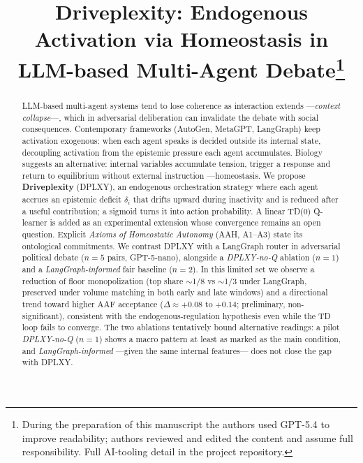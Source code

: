 \documentclass{llncs}
\begin{document}
\title{Driveplexity: Endogenous Activation via Homeostasis in
LLM-based Multi-Agent Debate\thanks{During the preparation of this
manuscript the authors used GPT-5.4 to improve readability; authors
reviewed and edited the content and assume full responsibility. Full
AI-tooling detail in the project repository.}}

\author{}
\institute{}

\maketitle

\begin{abstract}
LLM-based multi-agent systems tend to lose coherence as interaction
extends ---\emph{context collapse}---, which in adversarial
deliberation can invalidate the debate with social consequences.
Contemporary frameworks (AutoGen, MetaGPT, LangGraph) keep
activation exogenous: when each agent speaks is decided outside its
internal state, decoupling activation from the epistemic pressure
each agent accumulates. Biology suggests an alternative: internal
variables
accumulate tension, trigger a response and return to equilibrium
without external instruction ---homeostasis. We propose
\textbf{Driveplexity} (DPLXY), an endogenous orchestration
strategy where each agent accrues an epistemic deficit $\delta_i$
that drifts upward during inactivity and is reduced after a useful
contribution; a sigmoid turns it into action probability. A linear
TD(0) Q-learner is added as an experimental extension whose
convergence remains an open question. Explicit \emph{Axioms of
Homeostatic Autonomy} (AAH, A1--A3) state its ontological
commitments. We contrast DPLXY with a LangGraph router in
adversarial political debate ($n{=}5$ pairs, GPT-5-nano),
alongside a \emph{DPLXY-no-Q} ablation ($n{=}1$) and a
\emph{LangGraph-informed} fair baseline ($n{=}2$). In this limited
set we observe a reduction of floor monopolization (top share
$\sim$1/8 vs $\sim$1/3 under LangGraph, preserved under volume
matching in both early and late windows) and a directional trend
toward higher AAF acceptance ($\Delta\approx{+}0.08$ to
${+}0.14$; preliminary, non-significant), consistent with the
endogenous-regulation hypothesis even while the TD loop fails to
converge. The two ablations tentatively bound alternative
readings: a pilot \emph{DPLXY-no-Q} ($n{=}1$) shows a macro pattern
at least as marked as the main condition, and
\emph{LangGraph-informed} ---given the same internal features---
does not close the gap with DPLXY.

\end{abstract}
\end{document}
